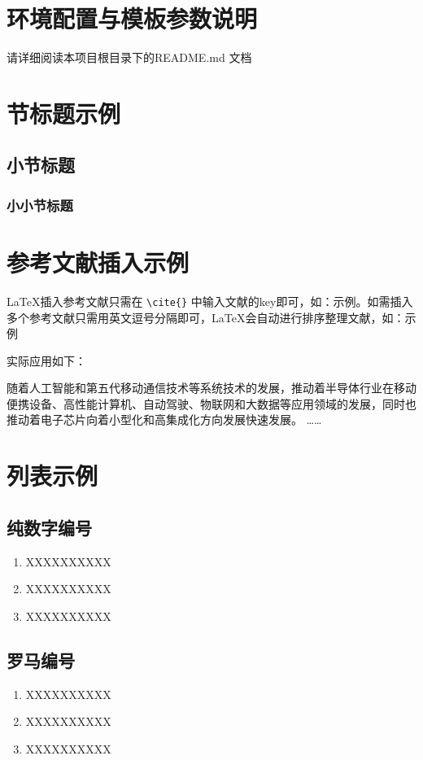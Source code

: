 \section{环境配置与模板参数说明}
请详细阅读本项目根目录下的README.md 文档

\section{节标题示例}

\subsection{小节标题}

\subsubsection{小小节标题}

\section{参考文献插入示例}

    \LaTeX 插入参考文献只需在 \verb|\cite{}| 中输入文献的key即可，如：示例\cite{Lau_2022}。如需插入多个参考文献只需用英文逗号分隔即可，\LaTeX 会自动进行排序整理文献，如：示例\cite{Sadique.Murtaza.ea_2022, Tan.Du.ea_2021, Lau_2022}

    实际应用如下：

    随着人工智能和第五代移动通信技术等系统技术的发展\cite{Lau_2022}，推动着半导体行业在移动便携设备、高性能计算机、自动驾驶、物联网和大数据等应用领域的发展\cite{Lau_2022}，同时也推动着电子芯片向着小型化和高集成化方向发展快速发展\cite{Lau_2022,Sadique.Murtaza.ea_2022, Tan.Du.ea_2021,Ying2018,redmonYOLO9000}。
……

\section{列表示例}

\subsection{纯数字编号}
\begin{enumerate}
 \item XXXXXXXXXX
 \item XXXXXXXXXX
 \item XXXXXXXXXX
\end{enumerate}

\subsection{罗马编号}
\begin{enumerate}[label=(\roman*)]
 \item XXXXXXXXXX
 \item XXXXXXXXXX
 \item XXXXXXXXXX
\end{enumerate}

